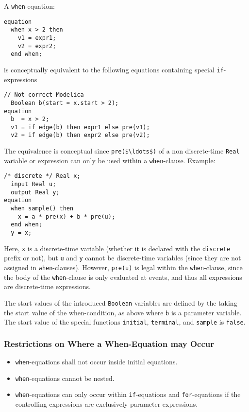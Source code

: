 A \lstinline!when!-equation:
\begin{lstlisting}[language=modelica]
equation
  when x > 2 then
    v1 = expr1;
    v2 = expr2;
  end when;
\end{lstlisting}
is conceptually equivalent to the following equations containing special \lstinline!if!-expressions
\begin{lstlisting}[language=modelica]
  // Not correct Modelica
  Boolean b(start = x.start > 2);
equation
  b  = x > 2;
  v1 = if edge(b) then expr1 else pre(v1);
  v2 = if edge(b) then expr2 else pre(v2);
\end{lstlisting}

\begin{nonnormative}
The equivalence is conceptual since \lstinline!pre($\ldots$)! of a non discrete-time \lstinline!Real! variable or expression can only be used within a \lstinline!when!-clause.
Example:
\begin{lstlisting}[language=modelica]
  /* discrete */ Real x;
  input Real u;
  output Real y;
equation
  when sample() then
    x = a * pre(x) + b * pre(u);
  end when;
  y = x;
\end{lstlisting}

Here, \lstinline!x! is a discrete-time variable (whether it is declared with the \lstinline!discrete! prefix or not), but \lstinline!u! and \lstinline!y! cannot be discrete-time variables
(since they are not assigned in \lstinline!when!-clauses).
However, \lstinline!pre(u)! is legal within the \lstinline!when!-clause, since the body of the \lstinline!when!-clause is only evaluated at events, and thus all expressions are discrete-time expressions.
\end{nonnormative}

The start values of the introduced \lstinline!Boolean! variables are defined by the taking the start value of the when-condition, as above where \lstinline!b! is a parameter variable.
The start value of the special functions \lstinline!initial!, \lstinline!terminal!, and \lstinline!sample! is \lstinline!false!.

\subsubsection{Restrictions on Where a When-Equation may Occur}\label{restrictions-on-where-a-when-equation-may-occur}

\begin{itemize}
\item
  \lstinline!when!-equations shall not occur inside initial equations.
\item
  \lstinline!when!-equations cannot be nested.
\item
  \lstinline!when!-equations can only occur within \lstinline!if!-equations and \lstinline!for!-equations if the controlling expressions are exclusively parameter expressions.
\end{itemize}

